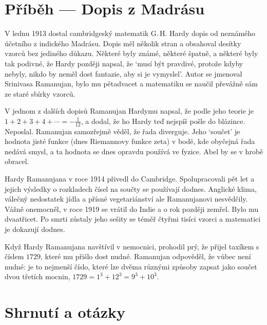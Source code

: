 \section{Příběh --- Dopis z Madrásu}

V lednu 1913 dostal cambridgeský matematik G.\,H. Hardy dopis od neznámého účetního z indického Madrásu. Dopis měl několik stran a obsahoval desítky vzorců bez jediného důkazu. Některé byly známé, některé špatně, a některé byly tak podivné, že Hardy později napsal, že `musí být pravdivé, protože kdyby nebyly, nikdo by neměl dost fantazie, aby si je vymyslel'. Autor se jmenoval Srinivasa Ramanujan, bylo mu pětadvacet a matematiku se naučil převážně sám ze staré sbírky vzorců.

V jednom z dalších dopisů Ramanujan Hardymu napsal, že podle jeho teorie je $1 + 2 + 3 + 4 + \cdots = -\frac{1}{12}$, a dodal, že ho Hardy teď nejspíš pošle do blázince. Neposlal. Ramanujan samozřejmě věděl, že řada diverguje. Jeho `součet' je hodnota jisté funkce (dnes Riemannovy funkce zeta) v bodě, kde obyčejná řada nedává smysl, a ta hodnota se dnes opravdu používá ve fyzice. Abel by se v hrobě obracel.

Hardy Ramanujana v roce 1914 přivedl do Cambridge. Spolupracovali pět let a jejich výsledky o rozkladech čísel na součty se používají dodnes. Anglické klima, válečný nedostatek jídla a přísné vegetariánství ale Ramanujanovi nesvědčily. Vážně onemocněl, v roce 1919 se vrátil do Indie a o rok později zemřel. Bylo mu dvaatřicet. Po smrti zůstaly jeho sešity se téměř čtyřmi tisíci vzorci a matematici je dokazují dodnes.

Když Hardy Ramanujana navštívil v nemocnici, prohodil prý, že přijel taxíkem s číslem $1729$, které mu přišlo dost nudné. Ramanujan odpověděl, že vůbec není nudné: je to nejmenší číslo, které lze dvěma různými způsoby zapsat jako součet dvou třetích mocnin, $1729 = 1^3 + 12^3 = 9^3 + 10^3$.

\section{Shrnutí a otázky}

